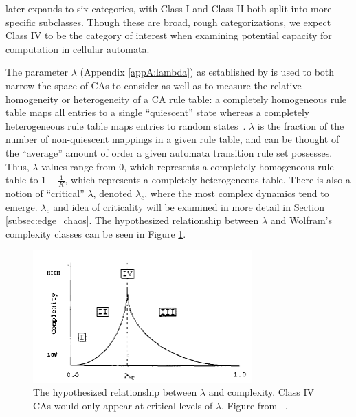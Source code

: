 \documentclass[a4paper,11pt]{report}
\begin{document}
\citeauthor{li90b} later expands to six categories, with Class I and Class II both split into more specific subclasses. Though these are broad, rough categorizations, we expect Class IV to be the category of interest when examining potential capacity for computation in cellular automata.

\medskip
The parameter $\lambda$ (Appendix \ref{appA:lambda}) as established by \citeauthor{la90} is used to both narrow the space of CAs to consider as well as to measure the relative homogeneity or heterogeneity of a CA rule table: a completely homogeneous rule table maps all entries to a single ``quiescent'' state whereas a completely heterogeneous rule table maps entries to random states~\cite{la90}. $\lambda$ is the fraction of the number of non-quiescent mappings in a given rule table, and can be thought of the ``average'' amount of order a given automata transition rule set possesses. Thus, $\lambda$ values range from $0$, which represents a completely homogeneous rule table to $1 - \frac{1}{K}$, which represents a completely heterogeneous table. There is also a notion of ``critical'' $\lambda$, denoted $\lambda_c$, where the most complex dynamics tend to emerge. $\lambda_c$ and idea of criticality will be examined in more detail in Section \ref{subsec:edge_chaos}. The hypothesized relationship between $\lambda$ and Wolfram's complexity classes can be seen in Figure \ref{fig:wolfram}.

\begin{figure}[htp]
	\centering
	\includegraphics[width=0.75\textwidth]{la90_fig16_wolfram_classes.png}
	\caption[Wolfram's Complexity Classes]{
	The hypothesized relationship between $\lambda$ and complexity. Class IV CAs would only appear at critical levels of $\lambda$. Figure from \citeauthor{la90}~\cite{la90}.
	}
	\label{fig:wolfram}
\end{figure}

\medskip
\end{document}
